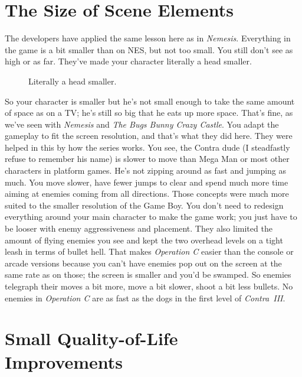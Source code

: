 \documentclass{book}
\begin{document}
\FloatBarrier\section*{The Size of Scene Elements}
The developers have applied the same lesson here as in \emph{Nemesis}. Everything in the game is a bit smaller than on NES, but not too small. You still don’t see as high or as far. They’ve made your character literally a head smaller.\par
\FloatBarrier\vspace{\baselineskip}\begin{figure}[H]\caption*{Literally a head smaller.}\end{figure}
So your character is smaller but he’s not small enough to take the same amount of space as on a TV; he’s still so big that he eats up more space. That’s fine, as we’ve seen with \emph{Nemesis} and \emph{The Bugs Bunny Crazy Castle}. You adapt the gameplay to fit the screen resolution, and that’s what they did here. They were helped in this by how the series works. You see, the Contra dude (I steadfastly refuse to remember his name) is slower to move than Mega Man or most other characters in platform games. He’s not zipping around as fast and jumping as much. You move slower, have fewer jumps to clear and spend much more time aiming at enemies coming from all directions. Those concepts were much more suited to the smaller resolution of the Game Boy. You don’t need to redesign everything around your main character to make the game work; you just have to be looser with enemy aggressiveness and placement. They also limited the amount of flying enemies you see and kept the two overhead levels on a tight leash in terms of bullet hell. That makes \emph{Operation C} easier than the console or arcade versions because you can’t have enemies pop out on the screen at the same rate as on those; the screen is smaller and you’d be swamped. So enemies telegraph their moves a bit more, move a bit slower, shoot a bit less bullets. No enemies in \emph{Operation C} are as fast as the dogs in the first level of \emph{Contra~III}.\par
\FloatBarrier\vspace{\baselineskip}\begin{figure}[H]\end{figure}
\FloatBarrier\section*{Small Quality-of-Life Improvements}
\end{document}
